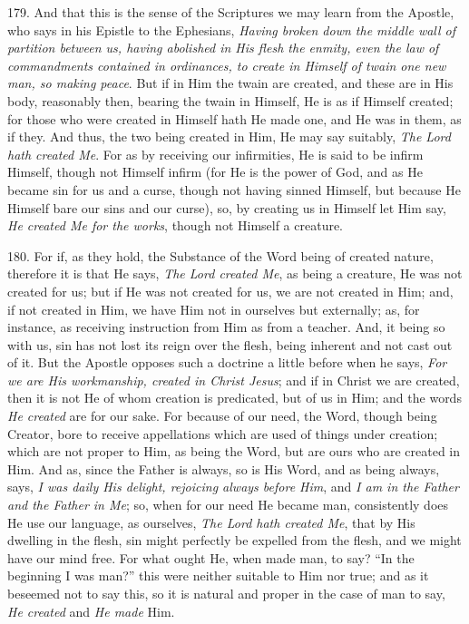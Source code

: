 179. And that this is the
sense of the Scriptures we may learn from the Apostle, who says in his
Epistle to the Ephesians, \emph{Having broken down the middle wall of
partition between us, having abolished in His flesh the enmity, even
the law of commandments contained in ordinances, to create in Himself
of twain one new man, so making peace}. But if in Him the twain are
created, and these are in His body, reasonably then, bearing the twain
in Himself, He is as if Himself created; for those who were created in
Himself hath He made one, and He was in them, as if they. And thus,
the two being created in Him, He may say suitably, \emph{The Lord hath
created Me}. For as by receiving our infirmities, He is said to be
infirm Himself, though not Himself infirm (for He is the power
of God, and as He became sin for us and a curse, though not having
sinned Himself, but because He Himself bare our sins and our curse),
so, by creating us in Himself let Him say, \emph{He created Me for the
works}, though not Himself a creature.

180. For if, as they hold, the
Substance of the Word being of created nature, therefore it is that He
says, \emph{The Lord created Me}, as being a creature, He was not
created for us; but if He was not created for us, we are not created
in Him; and, if not created in Him, we have Him not in ourselves but
externally; as, for instance, as receiving instruction from Him as
from a teacher. And, it being so with us, sin has not lost its reign
over the flesh, being inherent and not cast out of it. But the Apostle
opposes such a doctrine a little before when he says, \emph{For we are
His workmanship, created in Christ Jesus}; and if in Christ we are
created, then it is not He of whom creation is predicated, but of us
in Him; and the words \emph{He created} are for our sake. For because
of our need, the Word, though being Creator, bore to receive
appellations which are used of things under creation; which are not
proper to Him, as being the Word, but are ours who are created in Him.
And as, since the Father is always, so is His Word, and as being
always, says, \emph{I was daily His delight, rejoicing always before Him},
and \emph{I am in the Father and the Father in Me}; so, when for our
need He became man, consistently does He use our language, as
ourselves, \emph{The Lord hath created Me}, that by His dwelling in
the flesh, sin might perfectly be expelled from the flesh, and we
might have our mind free. For what ought He, when made man, to say? ``In
the beginning I was man?'' this were neither suitable to Him nor true;
and as it beseemed not to say this, so it is natural and proper in the
case of man to say, \emph{He created} and \emph{He made} Him.

